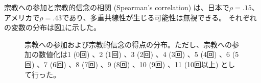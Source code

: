 \documentclass[a4j,12pt]{jreport}
\begin{document}
宗教への参加と宗教的信念の相関 (Spearman's correlation) は、日本で$\rho=.15$、アメリカで$\rho=.43$であり、多重共線性が生じる可能性は無視できる。
それぞれの変数の分布は図\ref{fig:Figure_Inte}に示した。
\begin{figure}[H]
  \centering
  
%
%
  
%  
%
  \caption[宗教への参加および宗教的信念の得点の分布]{宗教への参加および宗教的信念の得点の分布。ただし、宗教への参加の数値化は1 (0回) 、2 (1回) 、3 (2回) 、4 (3回) 、5 (4回) 、6 (5回) 、7 (6回) 、8 (7回) 、9 (8回) 、10 (9回) 、11 (10回以上) として行った。}
  \label{fig:Figure_Inte}
\end{figure}
\end{document}
